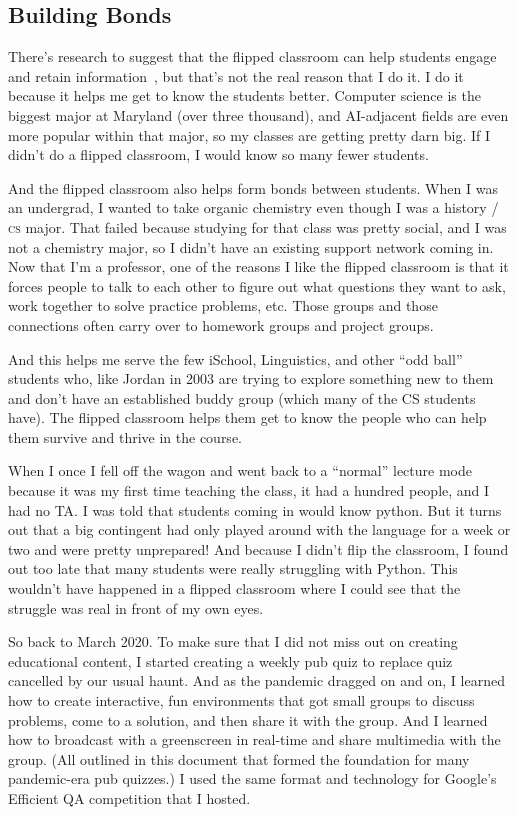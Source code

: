 \documentclass[11pt]{amsart}
\newcommand{\abr}[1]{\textsc{#1}}
\begin{document}
\subsection{Building Bonds}

There’s research to suggest that the flipped classroom can help
students engage and retain information~\cite{Zuber-16}, but that’s not
the real reason that I do it.
%
I do it because it helps me get to know the students better.  Computer
science is the biggest major at Maryland (over three thousand), and
AI-adjacent fields are even more popular within that major, so my
classes are getting pretty darn big.
%
If I didn’t do a flipped
classroom, I would know so many fewer students.

And the flipped classroom also helps form bonds between students.
%
When I was an undergrad, I wanted to take organic chemistry even
though I was a history / \abr{cs} major.
%
That failed because studying for
that class was pretty social, and I was not a chemistry major, so I
didn’t have an existing support network coming in.
%
Now that I’m a
professor, one of the reasons I like the flipped classroom is that it
forces people to talk to each other to figure out what questions they
want to ask, work together to solve practice problems, etc.
%
Those
groups and those connections often carry over to homework groups and
project groups.

And this helps me serve the few iSchool, Linguistics, and other ``odd
ball'' students who, like Jordan in 2003 are trying to explore
something new to them and don’t have an established buddy group (which
many of the CS students have).  The flipped classroom helps them get
to know the people who can help them survive and thrive in the course.

When I once I fell off the wagon and went back to a ``normal'' lecture
mode because it was my first time teaching the class, it had a hundred
people, and I had no TA.  I was told that students coming in would
know python.  But it turns out that a big contingent had only played
around with the language for a week or two and were pretty unprepared!
And because I didn’t flip the classroom, I found out too late that
many students were really struggling with Python.  This wouldn’t have
happened in a flipped classroom where I could see that the struggle
was real in front of my own eyes.

So back to March 2020. To make sure that I did not miss out on
creating educational content, I started creating a weekly pub quiz to
replace quiz cancelled by our usual haunt.  And as the pandemic
dragged on and on, I learned how to create interactive, fun
environments that got small groups to discuss problems, come to a
solution, and then share it with the group.  And I learned how to
broadcast with a greenscreen in real-time and share multimedia with
the group.  (All outlined in this document that formed the foundation
for many pandemic-era pub quizzes.)  I used the same format and
technology for Google’s Efficient QA competition that I hosted.
\end{document}
